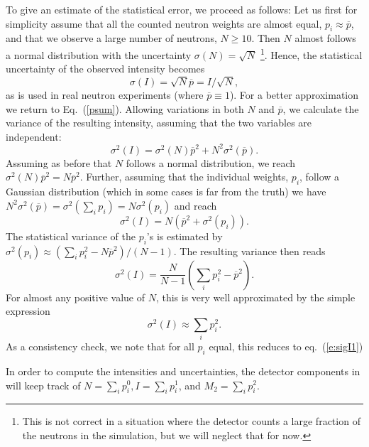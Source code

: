 To give an estimate of the statistical error, we proceed as follows:
Let us first for simplicity assume that all the counted neutron weights are
almost equal, $p_i \approx \overline{p}$,
and that we observe a large number of neutrons, $N \geq 10$.
Then $N$ almost follows a normal distribution
with the uncertainty $\sigma(N) = \sqrt{N}$
\footnote{This is not correct in a
situation where the detector counts a large fraction of the
neutrons in the simulation, but we will neglect that for now.}.
Hence, the statistical uncertainty of the observed intensity becomes
\begin{equation} \label{e:sigI1}
 \sigma(I) = \sqrt{N} \overline{p} = I / \sqrt{N} ,
\end{equation}
as is used in real neutron experiments (where $\overline{p} \equiv 1$).
For a better approximation we return to Eq.~(\ref{psum}).
Allowing variations in both $N$ and $\overline{p}$,
we calculate the variance of the resulting intensity,
assuming that the two variables are independent:
\begin{equation}
\sigma^2(I) = \sigma^2(N) \overline{p}^2 + N^2 \sigma^2(\overline{p}) .
\end{equation}
Assuming as before that $N$ follows a normal distribution, we reach
$\sigma^2(N) \overline{p}^2 = N \overline{p}^2$.
Further, assuming that the individual weights, $p_i$,
follow a Gaussian distribution (which in some cases is far from the truth)
we have
$N^2 \sigma^2(\overline{p}) = \sigma^2(\sum_i p_i) = N \sigma^2(p_i)$
and reach
\begin{equation}
\sigma^2(I) = N \left( \overline{p}^2 + \sigma^2(p_i) \right).
\end{equation}
The statistical variance of the $p_i$'s is estimated by
$\sigma^2(p_i) \approx  (\sum_i p_i^2 - N \overline{p}^2) / (N-1)$.
The resulting variance then reads
\begin{equation}
\sigma^2(I) = \frac{N}{N-1} \left( \sum_i p_i^2 - \overline{p}^2  \right) .
\end{equation}
For almost any positive value of $N$, this is very well approximated
by the simple expression
\begin{equation}
\sigma^2(I) \approx \sum_i p_i^2 .
\end{equation}
As a consistency check, we note that for all $p_i$ equal, this reduces to
eq.~(\ref{e:sigI1})

In order to compute the intensities and uncertainties, the detector components
in \MCS will keep track of
$N=\sum_i p_i^0, I=\sum_i p_i^1$, and $M_2 = \sum_i p_i^2$.

